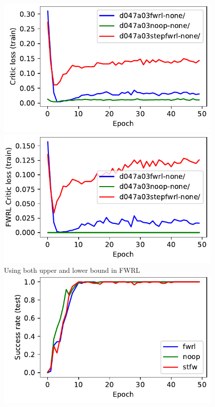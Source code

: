 \begin{figure}
  \includegraphics[width=\frac\columnwidth]{media/res/d047a03-FetchReach-v1-stepfwrl-none/train/critic_loss.pdf}%
  \includegraphics[width=\frac\columnwidth]{media/res/d047a03-FetchReach-v1-stepfwrl-none/train/critic_addnl_loss.pdf}\\
Using both upper and lower bound in FWRL\\
  \includegraphics[width=\frac\columnwidth]{media/res/f0d4cfa-FetchReach-v1-stfw-none/test/success_rate.pdf}%

\end{figure}
